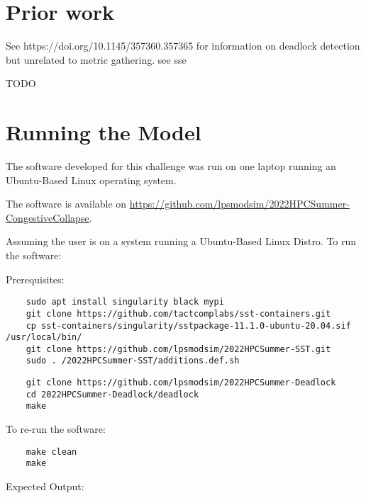 \documentclass{article}
\begin{document}
\section{Prior work} %

See https://doi.org/10.1145/357360.357365 for information on deadlock detection but unrelated to metric gathering.
see %
sse %

TODO

\section{Running the Model}

The software developed for this challenge was run on one laptop running an Ubuntu-Based Linux operating system.

\noindent The software is available on \href{https://github.com/lpsmodsim/2022HPCSummer-CongestiveCollapse}{https://github.com/lpsmodsim/2022HPCSummer-CongestiveCollapse}.\newline

\noindent Assuming the user is on a system running a Ubuntu-Based Linux Distro. To run the software:\newline

\noindent Prerequisites: 

\begin{verbatim}
	sudo apt install singularity black mypi
	git clone https://github.com/tactcomplabs/sst-containers.git
	cp sst-containers/singularity/sstpackage-11.1.0-ubuntu-20.04.sif /usr/local/bin/
	git clone https://github.com/lpsmodsim/2022HPCSummer-SST.git
	sudo . /2022HPCSummer-SST/additions.def.sh
\end{verbatim}

\begin{verbatim}
	git clone https://github.com/lpsmodsim/2022HPCSummer-Deadlock
	cd 2022HPCSummer-Deadlock/deadlock
	make
\end{verbatim}

\noindent To re-run the software:

\begin{verbatim}
	make clean
	make
\end{verbatim}

\noindent Expected Output:
\end{document}
